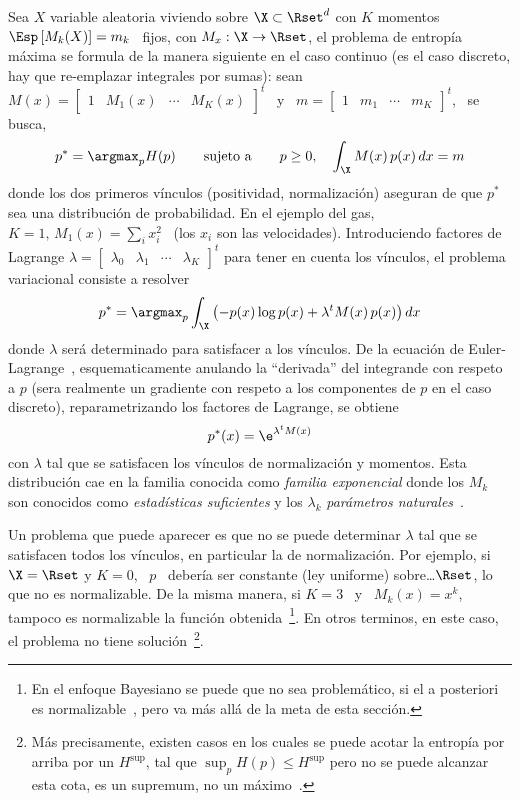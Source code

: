 Sea $X$ variable aleatoria viviendo  sobre $\X \subset \Rset^d$ con $K$ momentos
\  $\Esp\left[ M_k(X)  \right]  = m_k$  \ fijos,  con  $M_x: \X  \to \Rset$,  el
problema de  entrop\'ia m\'axima se  formula de la  manera siguiente en  el caso
continuo (es el caso discreto, hay que re-emplazar integrales por sumas): sean \
$M(x) = \begin{bmatrix} 1  & M_1(x) & \cdots & M_K(x) \end{bmatrix}^t$  \ y \ $m
= \begin{bmatrix} 1 & m_1 & \cdots & m_K \end{bmatrix}^t$, \ se busca,
%
\[
p^* = \argmax_p H(p) \qquad \mbox{sujeto a} \qquad p \ge 0, \quad \int_\X M(x)
\, p(x) \, dx = m
\]
%
donde los dos primeros v\'inculos (positividad, normalizaci\'on) aseguran de que
$p^*$ sea una distribuci\'on de probabilidad. En  el ejemplo del gas, $K = 1, \,
M_1(x) = \sum_i x_i^2$ \ (los $x_i$ son las velocidades). Introduciendo factores
de  Lagrange  $\lambda  =  \begin{bmatrix}  \lambda_0 &  \lambda_1  &  \cdots  &
  \lambda_K \end{bmatrix}^t$  para tener en  cuenta los v\'inculos,  el problema
variacional   consiste  a   resolver~\cite{GelFom63,  Bru04,   Mil00,  CamMar09,
  CovTho06}
%
\[
p^* = \argmax_p \int_\X \left( - p(x) \log p(x) + \lambda^t M(x) \, p(x) \right)
dx
\]
%
donde  $\lambda$ ser\'a  determinado para  satisfacer a  los v\'inculos.   De la
ecuaci\'on  de Euler-Lagrange~\cite{GelFom63, Bru04},  esquematicamente anulando
la ``derivada''  del integrande con respeto  a $p$ (sera  realmente un gradiente
con respeto a los componentes de  $p$ en el caso discreto), reparametrizando los
factores de Lagrange, se obtiene
%
\[
p^*(x) = \e^{\lambda^t M(x)}
\]
%
con $\lambda$ tal que se  satisfacen los v\'inculos de normalizaci\'on y momentos.
Esta distribuci\'on  cae en la  familia conocida como {\it  familia exponencial}
donde  los $M_k$  son  conocidos  como {\it  estad\'isticas  suficientes} y  los
$\lambda_k$  {\it   par\'ametros  naturales}~\cite{Dar35,  Koo36,   And70,  Kay93,
  LehCas98, Rob07}.

Un problema que  puede aparecer es que no se puede  determinar $\lambda$ tal que
se satisfacen  todos los v\'inculos,  en particular la de  normalizaci\'on.  Por
ejemplo,  si $\X  = \Rset$  y $K  = 0$,  \ $p$  \ deber\'ia  ser  constante (ley
uniforme) sobre\ldots $\Rset$, lo que no es normalizable. De la misma manera, si
$K  =  3$  \  y  \   $M_k(x)  =  x^k$,  tampoco  es  normalizable  la  funci\'on
obtenida~\footnote{En el  enfoque Bayesiano se puede que  no sea problem\'atico,
  si el  a posteriori es normalizable~\cite{Rob07},  pero va m\'as  all\'a de la
  meta de  esta secci\'on.}.  En  otros terminos, en  este caso, el  problema no
tiene soluci\'on~\footnote{M\'as  precisamente, existen  casos en los  cuales se
  puede acotar la entrop\'ia por arriba  por un $H^{\sup}$, tal que $\sup_p H(p)
  \le H^{\sup}$ pero no  se puede alcanzar esta cota, \ie es  un supremum, no un
  m\'aximo~\cite[sec.~12.3]{CovTho06}.}.

